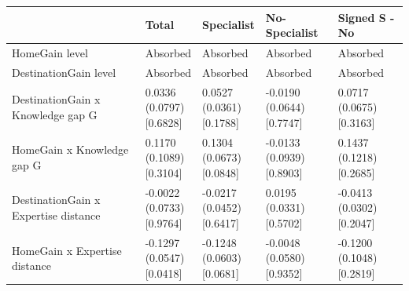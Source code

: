 \begin{tabular}{@{}>{\raggedright\arraybackslash}p{2.530in}>{\centering\arraybackslash}p{0.905in}>{\centering\arraybackslash}p{0.905in}>{\centering\arraybackslash}p{0.905in}>{\centering\arraybackslash}p{0.905in}@{}}
\toprule
 & Total & Specialist & No-Specialist & Signed S - No \\
\midrule
HomeGain level & Absorbed & Absorbed & Absorbed & Absorbed \\
DestinationGain level & Absorbed & Absorbed & Absorbed & Absorbed \\
DestinationGain x Knowledge gap G & \makecell[c]{0.0336\\{}(0.0797)\\{}[0.6828]} & \makecell[c]{0.0527\\{}(0.0361)\\{}[0.1788]} & \makecell[c]{-0.0190\\{}(0.0644)\\{}[0.7747]} & \makecell[c]{0.0717\\{}(0.0675)\\{}[0.3163]} \\
HomeGain x Knowledge gap G & \makecell[c]{0.1170\\{}(0.1089)\\{}[0.3104]} & \makecell[c]{0.1304\\{}(0.0673)\\{}[0.0848]} & \makecell[c]{-0.0133\\{}(0.0939)\\{}[0.8903]} & \makecell[c]{0.1437\\{}(0.1218)\\{}[0.2685]} \\
DestinationGain x Expertise distance & \makecell[c]{-0.0022\\{}(0.0733)\\{}[0.9764]} & \makecell[c]{-0.0217\\{}(0.0452)\\{}[0.6417]} & \makecell[c]{0.0195\\{}(0.0331)\\{}[0.5702]} & \makecell[c]{-0.0413\\{}(0.0302)\\{}[0.2047]} \\
HomeGain x Expertise distance & \makecell[c]{-0.1297\\{}(0.0547)\\{}[0.0418]} & \makecell[c]{-0.1248\\{}(0.0603)\\{}[0.0681]} & \makecell[c]{-0.0048\\{}(0.0580)\\{}[0.9352]} & \makecell[c]{-0.1200\\{}(0.1048)\\{}[0.2819]} \\

\end{tabular}
